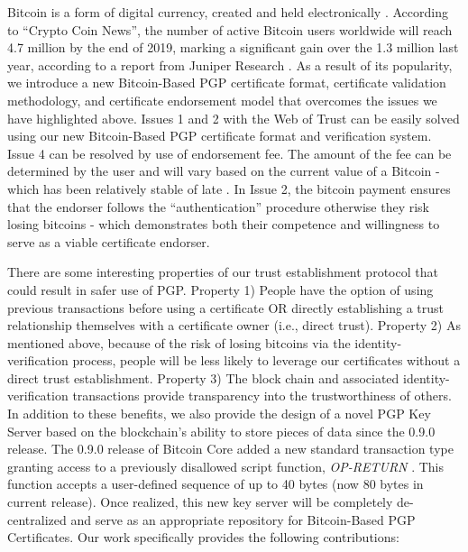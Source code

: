\documentclass{llncs}
\begin{document}
Bitcoin is a form of digital currency, created and held electronically \cite{cd}.  According to ``Crypto Coin News'', the number of active Bitcoin users worldwide will reach 4.7 million by the end of 2019, marking a significant gain over the 1.3 million last year, according to a report from Juniper Research \cite{busers}.  As a result of its popularity, we introduce a new Bitcoin-Based PGP certificate format, certificate validation methodology, and certificate endorsement model that overcomes the issues we have highlighted above.  Issues 1 and 2 with the Web of Trust can be easily solved using our new Bitcoin-Based PGP certificate format and verification system. Issue 4 can be resolved by use of endorsement fee. The amount of the fee can be determined by the user and will vary based on the current value of a Bitcoin - which has been relatively stable of late \cite{stable}.  In Issue 2, the bitcoin payment ensures that the endorser follows the ``authentication'' procedure otherwise they risk losing bitcoins - which demonstrates both their competence and willingness to serve as a viable certificate endorser.

There are some interesting properties of our trust establishment protocol that could result in safer use of PGP. Property 1) People have the option of using previous transactions before using a certificate OR directly establishing a trust relationship themselves with a certificate owner (i.e., direct trust). Property 2) As mentioned above, because of the risk of losing bitcoins via the identity-verification process, people will be less likely to leverage our certificates without a direct trust establishment.  Property 3) The block chain and associated identity-verification transactions provide transparency into the trustworthiness of others.  In addition to these benefits, we also provide the design of a novel PGP Key Server based on the blockchain's ability to store pieces of data since the 0.9.0 release.  The 0.9.0 release of Bitcoin Core added a new standard transaction type granting access to a previously disallowed script function, \textit{OP-RETURN} \cite{opreturn}.  This function accepts a user-defined sequence of up to 40 bytes (now 80 bytes in current release).  Once realized, this new key server will be completely de-centralized and serve as an appropriate repository for Bitcoin-Based PGP Certificates.  Our work specifically provides the following contributions:
\end{document}
